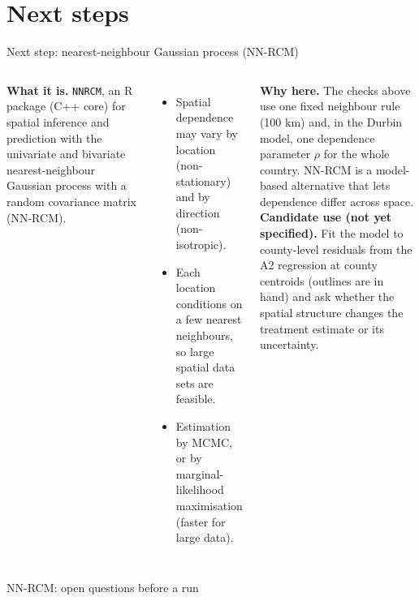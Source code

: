 \documentclass[aspectratio=169]{beamer}
\begin{document}
\section{Next steps}

\begin{frame}{Next step: nearest-neighbour Gaussian process (NN-RCM)}
\vspace{-4pt}
\begin{columns}[T,onlytextwidth]
{\footnotesize
\textbf{What it is.} \texttt{NNRCM}, an R package (C++ core) for spatial inference and prediction with the univariate and bivariate nearest-neighbour Gaussian process with a random covariance matrix (NN-RCM).
\begin{itemize}\footnotesize
  \item Spatial dependence may vary by location (non-stationary) and by direction (non-isotropic).
  \item Each location conditions on a few nearest neighbours, so large spatial data sets are feasible.
  \item Estimation by MCMC, or by marginal-likelihood maximisation (faster for large data).
\end{itemize}}
{\footnotesize
\textbf{Why here.} The checks above use one fixed neighbour rule (100 km) and, in the Durbin model, one dependence parameter $\rho$ for the whole country. NN-RCM is a model-based alternative that lets dependence differ across space.\\[0.5em]
\textbf{Candidate use (not yet specified).} Fit the model to county-level residuals from the A2 regression at county centroids (outlines are in hand) and ask whether the spatial structure changes the treatment estimate or its uncertainty.}
\end{columns}
\end{frame}

\begin{frame}{NN-RCM: open questions before a run}
\end{frame}
\end{document}
